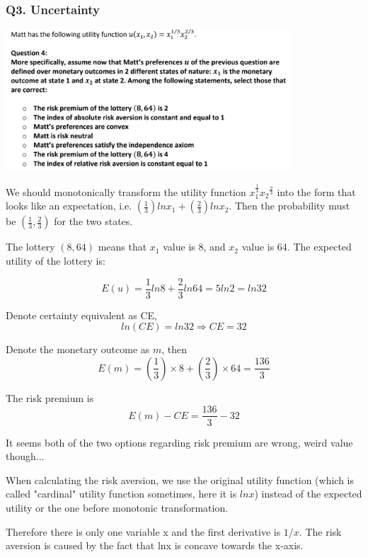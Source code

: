 \documentclass{article}
\begin{document}
\subsubsection{Q3. Uncertainty}

\begin{center}
\includegraphics[width=0.8\textwidth]{e3200_2018_q3}
\end{center}
\vspace{2mm}

We should monotonically transform the utility function  $x_1^{\frac{1}{3}}{x_2}^{\frac{2}{3}}$ into the form that looks like an expectation, i.e. $(\frac{1}{3})ln x_1 + (\frac{2}{3})ln x_2$. Then the probability must be $(\frac{1}{3},\frac{2}{3})$ for the two states. 

\smallskip

The lottery $(8,64)$ means that $x_1$ value is $8$, and $x_2$ value is 64. The expected utility of the lottery is:

$$E(u)= \frac{1}{3} ln8 +\frac{2}{3} ln64 = 5ln2 = ln32$$

Denote certainty equivalent as CE,
$$ln(CE)=ln32 \Rightarrow CE = 32$$

Denote the monetary outcome as $m$, then
$$E(m) = (\frac{1}{3}) \times 8 +  (\frac{2}{3}) \times 64 = \frac{136}{3}$$

The risk premium is $$E(m)-CE = \frac{136}{3} -32$$

It seems both of the two options regarding risk premium are wrong, weird value though...

\medskip

When calculating the risk aversion, we use the original utility function (which is called "cardinal" utility function sometimes, here it is $lnx$) instead of the expected utility or the one before monotonic transformation. 

\smallskip

Therefore there is only one variable x and the first derivative is $1/x$. The risk aversion is caused by the fact that lnx is concave towards the x-axis.
\end{document}

